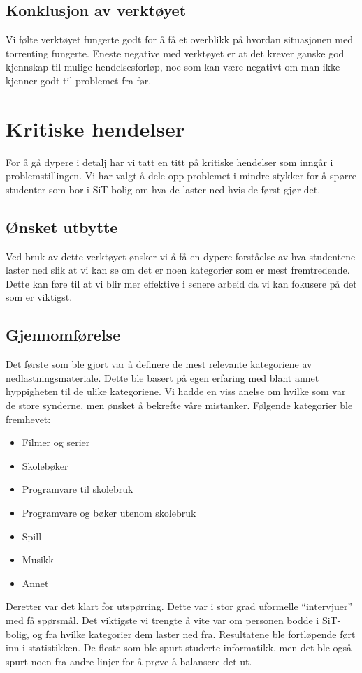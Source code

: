 \subsection{Konklusjon av verktøyet}
Vi følte verktøyet fungerte godt for å få et overblikk på hvordan situasjonen med torrenting fungerte. Eneste negative med verktøyet er at det krever ganske god kjennskap til mulige hendelsesforløp, noe som kan være negativt om man ikke kjenner godt til problemet fra før. 

\section{Kritiske hendelser}
For å gå dypere i detalj har vi tatt en titt på kritiske hendelser som inngår i problemstillingen. Vi har valgt å dele opp problemet i mindre stykker for å spørre studenter som bor i SiT-bolig om hva de laster ned hvis de først gjør det. 

\subsection{Ønsket utbytte}
Ved bruk av dette verktøyet ønsker vi å få en dypere forståelse av hva studentene laster ned slik at vi kan se om det er noen kategorier som er mest fremtredende. Dette kan føre til at vi blir mer effektive i senere arbeid da vi kan fokusere på det som er viktigst.

\subsection{Gjennomførelse}
Det første som ble gjort var å definere de mest relevante kategoriene av nedlastningsmateriale. Dette ble basert på egen erfaring med blant annet hyppigheten til de ulike kategoriene. Vi hadde en viss anelse om hvilke som var de store synderne, men ønsket å bekrefte våre mistanker. Følgende kategorier ble fremhevet: 
\begin{itemize}
    \item Filmer og serier
    \item Skolebøker
    \item Programvare til skolebruk
    \item Programvare og bøker utenom skolebruk
    \item Spill
    \item Musikk
    \item Annet
\end{itemize}

Deretter var det klart for utspørring. Dette var i stor grad uformelle ``intervjuer'' med få spørsmål. Det viktigste vi trengte å vite var om personen bodde i SiT-bolig, og fra hvilke kategorier dem laster ned fra. Resultatene ble fortløpende ført inn i statistikken. De fleste som ble spurt studerte informatikk, men det ble også spurt noen fra andre linjer for å prøve å balansere det ut.

